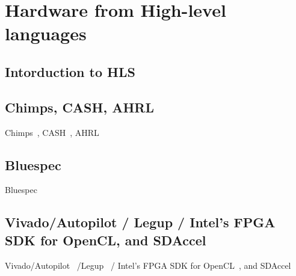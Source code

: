

\section{Hardware from High-level languages}

\subsection{Intorduction to HLS}
\cite{gajski_1994_introduction}

\subsection{Chimps, CASH, AHRL}

Chimps~\cite{chimps}, CASH~\cite{budiu_pegasus_2002,budiu_cash_2002}, AHRL~\cite{ahrl}
%

\subsection{Bluespec}
Bluespec~\cite{bluespec}
%

\subsection{Vivado/Autopilot / Legup / Intel's FPGA SDK for OpenCL, and SDAccel}

Vivado/Autopilot~\cite{vivado,vivadohls,autopilot} /Legup~\cite{canis_2011_legup} / Intel's FPGA SDK for OpenCL~\cite{opencl_sdk}, and SDAccel~\cite{sdaccel}
%

